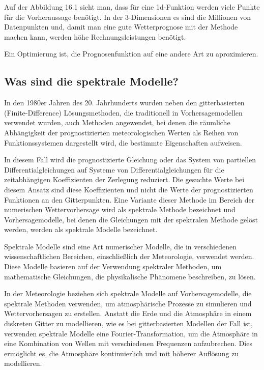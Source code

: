 Auf der Abbildung 16.1 sieht man, dass für eine 1d-Funktion werden viele Punkte für die Vorheraussage benötigt. In der 3-Dimensionen es sind die Millionen von Datenpunkten und, damit man eine gute Wetterprognose mit der Methode machen kann, werden höhe Rechnungsleistungen benötigt.

Ein Optimierung ist, die Prognosenfunktion auf eine andere Art zu aproximieren.


\subsection{Was sind die spektrale Modelle?
\label{spektral:subsection:spektralemodelle}}
In den 1980er Jahren des 20. Jahrhunderts wurden neben den gitterbasierten (Finite-Difference) Lösungsmethoden, die traditionell in Vorhersagemodellen verwendet wurden, auch Methoden angewendet, bei denen die räumliche Abhängigkeit der prognostizierten meteorologischen Werten als Reihen von Funktionssystemen dargestellt wird, die bestimmte Eigenschaften aufweisen.

In diesem Fall wird die prognostizierte Gleichung oder das System von partiellen Differentialgleichungen auf Systeme von Differentialgleichungen für die zeitabhängigen Koeffizienten der Zerlegung reduziert.
Die gesuchte Werte bei diesem Ansatz sind diese Koeffizienten und nicht die Werte der prognostizierten Funktionen an den Gitterpunkten. 
Eine Variante dieser Methode im Bereich der numerischen Wettervorhersage wird als spektrale Methode bezeichnet und Vorhersagemodelle, bei denen die Gleichungen mit der spektralen Methode gelöst werden, werden als spektrale Modelle bezeichnet.

Spektrale Modelle sind eine Art numerischer Modelle, die in verschiedenen wissenschaftlichen Bereichen, einschließlich der Meteorologie, verwendet werden.
Diese Modelle basieren auf der Verwendung spektraler Methoden, um mathematische Gleichungen, die physikalische Phänomene beschreiben, zu lösen.

In der Meteorologie beziehen sich spektrale Modelle auf Vorhersagemodelle, die spektrale Methoden verwenden, um atmosphärische Prozesse zu simulieren und Wettervorhersagen zu erstellen.
Anstatt die Erde und die Atmosphäre in einem diskreten Gitter zu modellieren, wie es bei gitterbasierten Modellen der Fall ist, verwenden spektrale Modelle eine Fourier-Transformation, um die Atmosphäre in eine Kombination von Wellen mit verschiedenen Frequenzen aufzubrechen.
Dies ermöglicht es, die Atmosphäre kontinuierlich und mit höherer Auflösung zu modellieren.

